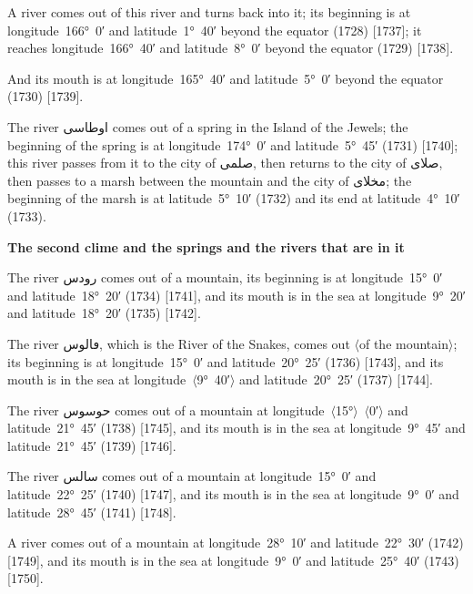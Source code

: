 \documentclass[11pt]{article}
\newcommand{\Pg}[1]{\marginpar{\footnotesize #1}}
\newcommand{\Ang}[1]{\ensuremath{#1}}
\begin{document}
A river comes out of this river and turns back into it; its beginning is at longitude~166°~0′ and latitude~1°~40′ beyond the equator (1728) [1737]; it reaches longitude~166°~40′ and latitude~8°~0′ beyond the equator (1729) [1738].

And its mouth is at longitude~165°~40′ and latitude~5°~0′ beyond the equator (1730) [1739].

\Pg{p. 115}The river \textarabic{اوطاسى} comes out of a spring in the Island of the Jewels; the beginning of the spring is at longitude~174°~0′ and latitude~5°~45′ (1731) [1740]; this river passes from it to the city of \textarabic{صلمى}, then returns to the city of \textarabic{صلاى}, then passes to a marsh between the mountain and the city of \textarabic{مخلاى}; the beginning of the marsh is at latitude~5°~10′ (1732) and its end at latitude~4°~10′ (1733).

\par\medskip\begin{center}\bfseries The second clime and the springs and the rivers that are in it\end{center}\par

The river \textarabic{رودس} comes out of a mountain, its beginning is at longitude~15°~0′ and latitude~18°~20′ (1734) [1741], and its mouth is in the sea at longitude~9°~20′ and latitude~18°~20′ (1735) [1742].

The river \textarabic{ڡالوس}, which is the River of the Snakes, comes out \Ang{\langle}of the mountain\Ang{\rangle}; its beginning is at longitude~15°~0′ and latitude~20°~25′ (1736) [1743], and its mouth is in the sea at longitude~\Ang{\langle}9°~40′\Ang{\rangle} and latitude~20°~25′ (1737) [1744].

The river \textarabic{حوسوس} comes out of a mountain at longitude~\Ang{\langle}15°\Ang{\rangle}~\Ang{\langle}0′\Ang{\rangle} and latitude~21°~45′ (1738) [1745], and its mouth is in the sea at longitude~9°~45′ and latitude~21°~45′ (1739) [1746].

The river \textarabic{سالس} comes out of a mountain at longitude~15°~0′ and latitude~22°~25′ (1740) [1747], and its mouth is in the sea at longitude~9°~0′ and latitude~28°~45′ (1741) [1748].

A river comes out of a mountain at longitude~28°~10′ and latitude~22°~30′ (1742) [1749], and its mouth is in the sea at longitude~9°~0′ and latitude~25°~40′ (1743) [1750]\Pg{p. 116}.
\end{document}
